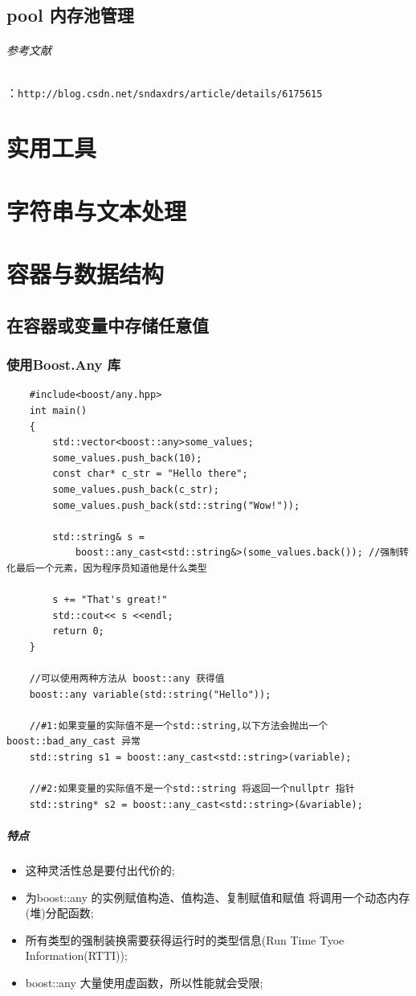 \documentclass[UTF8,a4paper,12pt]{ctexbook}
\begin{document}
	\section{pool 内存池管理}
			\subparagraph{参考文献}：\verb|http://blog.csdn.net/sndaxdrs/article/details/6175615|
\newpage
\chapter{实用工具}


\newpage
\chapter{字符串与文本处理}


\newpage
\chapter{容器与数据结构}
\section{在容器或变量中存储任意值}
	\subsection{使用Boost.Any 库}
	\begin{lstlisting}
	#include<boost/any.hpp>
	int main()
	{
		std::vector<boost::any>some_values;
		some_values.push_back(10);
		const char* c_str = "Hello there";
		some_values.push_back(c_str);
		some_values.push_back(std::string("Wow!"));
		
		std::string& s = 
			boost::any_cast<std::string&>(some_values.back()); //强制转化最后一个元素，因为程序员知道他是什么类型
		
		s += "That's great!"
		std::cout<< s <<endl;	
		return 0;
	}
	
	//可以使用两种方法从 boost::any 获得值
	boost::any variable(std::string("Hello"));
	
	//#1:如果变量的实际值不是一个std::string,以下方法会抛出一个boost::bad_any_cast 异常
	std::string s1 = boost::any_cast<std::string>(variable);
	
	//#2:如果变量的实际值不是一个std::string 将返回一个nullptr 指针
	std::string* s2 = boost::any_cast<std::string>(&variable);
	\end{lstlisting}
	
		\paragraph{特点}
		\begin{itemize}
			\item 这种灵活性总是要付出代价的;
			\item 为boost::any 的实例赋值构造、值构造、复制赋值和赋值 将调用一个动态内存(堆)分配函数;
			\item 所有类型的强制装换需要获得运行时的类型信息(Run Time Tyoe Information(RTTI));
			\item boost::any 大量使用虚函数，所以性能就会受限;
		\end{itemize}
		
\end{document}
